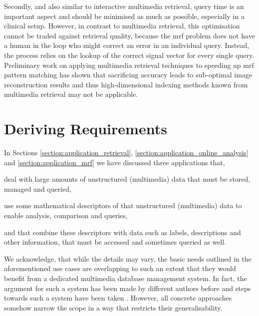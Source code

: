 Secondly, and also similar to interactive multimedia retrieval, query time is an important aspect and should be minimised as much as possible, especially in a clinical setup. However, in contrast to multimedia retrieval, this optimisation cannot be traded against retrieval quality, because the \acrshort{mrf} problem does not have a human in the loop who might correct an error in an individual query. Instead, the process relies on the lookup of the correct signal vector for every single query. Preliminary work on applying multimedia retrieval techniques to speeding up \acrshort{mrf} pattern matching has shown that sacrificing accuracy leads to sub-optimal image reconstruction results \cite{Huerbin:2020Retrieval,Zihlmann:2021Magnetic} and thus high-dimensional indexing methods known from multimedia retrieval may not be applicable.

\section{Deriving Requirements}
\label{section:requirements}
In Sections \ref{section:application_retrieval}, \ref{section:application_online_analysis} and \ref{section:application_mrf} we have discussed three applications that, 
\begin{enumerate*}[label=(\roman*)]
    \item deal with large amounts of unstructured (multimedia) data that must be stored, managed and queried,
    \item use some mathematical descriptors of that unstructured (multimedia) data to enable analysis, comparison and queries,
    \item and that combine these descriptors with data such as labels, descriptions and other information, that must be accessed and sometimes queried as well.
\end{enumerate*}

We acknowledge, that while the details may vary, the basic needs outlined in the aforementioned use cases are overlapping to such an extent that they would benefit from a dedicated multimedia database management system. In fact, the argument for such a system has been made by different authors before \cite{Adjeroh:1997Multimedia,Smeulders:2000Content,Jonsson:2016Ten,Jonsson:2019Data,Khaleel:2021An} and steps towards such a system have been taken \cite{Giangreco:2018Database,Wang:2021Milvus}. However, all concrete approaches somehow narrow the scope in a way that restricts their generalisability.


